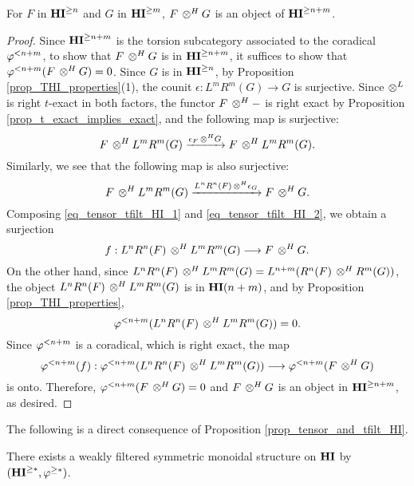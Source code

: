 \begin{prop}\label{prop_tensor_and_tfilt_HI}
For $F$ in $\THI{n}$ and $G$ in $\THI{m}$, $F \tHI G$
is an object of $\THI{n + m}$.
\end{prop}
\begin{proof}
Since $\THI{n + m}$ is the torsion subcategory associated to the
coradical $\tlHI{n + m}$, to show that $F \tHI G$ is in 
$\THI{n + m}$, it suffices to show that $\tlHI{n + m}(F \tHI G) = 
0$. Since $G$ is in $\THI{n}$, by Proposition 
\ref{prop_THI_properties}(1), the counit $\epsilon: L^mR^m(G) \to 
G$ is surjective. Since $\tDM$ is right $t$-exact in both factors, 
the functor $F \tHI -$ is right exact by Proposition 
\ref{prop_t_exact_implies_exact}, and the following map is surjective:
\begin{equation}\label{eq_tensor_tfilt_HI_1}
F \tHI L^mR^m(G) \xrightarrow{\epsilon_F \tHI G} F \tHI L^mR^m(G).
\end{equation}
Similarly, we see that the following map is
also surjective:
\begin{equation}\label{eq_tensor_tfilt_HI_2}
F \tHI L^mR^m(G) \xrightarrow{L^nR^n(F) \tHI \epsilon_G}
F \tHI G.
\end{equation}
Composing \eqref{eq_tensor_tfilt_HI_1} and 
\eqref{eq_tensor_tfilt_HI_2}, we obtain a surjection
\[
f: L^nR^n(F) \tHI L^mR^m(G) \to F \tHI G.
\]
On the other hand, since $L^nR^n(F) \tHI L^mR^m(G) = 
L^{n + m}(R^n(F) \tHI R^m(G))$, the object $L^nR^n(F) \tHI L^mR^m(G)$
is in $\LHI[n + m]{\HI}$, and by Proposition
\ref{prop_THI_properties}, 
\[
\tlHI{n + m}(L^nR^n(F) \tHI L^mR^m(G)) = 0. 
\]
Since $\tlHI{n + m}$ is a coradical, which is right exact, the map
\[
\tlHI{n + m}(f) : \tlHI{n + m}(L^nR^n(F) \tHI L^mR^m(G)) \to
   \tlHI{n + m}(F \tHI G)
\]
is onto. Therefore, $\tlHI{n + m}(F \tHI G) = 0$ and 
$F \tHI G$ is an object in $\THI{n + m}$, as desired.
\end{proof}

The following is a direct consequence of Proposition 
\ref{prop_tensor_and_tfilt_HI}.

\begin{cor}\label{cor_graded_tensor_HI}
There exists a weakly filtered symmetric monoidal structure on $\HI$ by
$(\THI{*}, \tgHI{*})$.
\end{cor}
